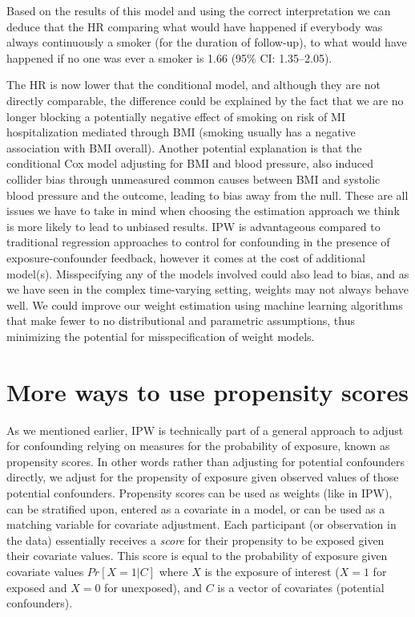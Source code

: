 \documentclass[
]{book}
\begin{document}
Based on the results of this model and using the correct interpretation we can deduce that the HR comparing what would have happened if everybody was always continuously a smoker (for the duration of follow-up), to what would have happened if no one was ever a smoker is 1.66 (95\% CI: 1.35--2.05).

The HR is now lower that the conditional model, and although they are not directly comparable, the difference could be explained by the fact that we are no longer blocking a potentially negative effect of smoking on risk of MI hospitalization mediated through BMI (smoking usually has a negative association with BMI overall). Another potential explanation is that the conditional Cox model adjusting for BMI and blood pressure, also induced collider bias through unmeasured common causes between BMI and systolic blood pressure and the outcome, leading to bias away from the null. These are all issues we have to take in mind when choosing the estimation approach we think is more likely to lead to unbiased results. IPW is advantageous compared to traditional regression approaches to control for confounding in the presence of exposure-confounder feedback, however it comes at the cost of additional model(s). Misspecifying any of the models involved could also lead to bias, and as we have seen in the complex time-varying setting, weights may not always behave well. We could improve our weight estimation using machine learning algorithms that make fewer to no distributional and parametric assumptions, thus minimizing the potential for misspecification of weight models.

\hypertarget{more-ways-to-use-propensity-scores}{%
\section{More ways to use propensity scores}\label{more-ways-to-use-propensity-scores}}

As we mentioned earlier, IPW is technically part of a general approach to adjust for confounding relying on measures for the probability of exposure, known as propensity scores. In other words rather than adjusting for potential confounders directly, we adjust for the propensity of exposure given observed values of those potential confounders. Propensity scores can be used as weights (like in IPW), can be stratified upon, entered as a covariate in a model, or can be used as a matching variable for covariate adjustment. Each participant (or observation in the data) essentially receives a \emph{score} for their propensity to be exposed given their covariate values. This score is equal to the probability of exposure given covariate values \(Pr[X=1|C]\) where \(X\) is the exposure of interest (\(X=1\) for exposed and \(X=0\) for unexposed), and \(C\) is a vector of covariates (potential confounders).
\end{document}
